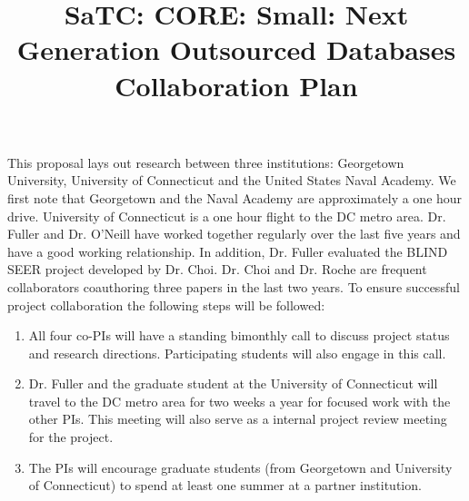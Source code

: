 \documentclass[11pt]{article}
\begin{document}
\title{SaTC: CORE: Small: Next Generation Outsourced Databases \\Collaboration Plan}

\maketitle

This proposal lays out research between three institutions: Georgetown University, University of Connecticut and the United States Naval Academy.  We first note that Georgetown and the Naval Academy are approximately a one hour drive.  University of Connecticut is a one hour flight to the DC metro area. Dr. Fuller and Dr. O'Neill have worked together regularly over the last five years and have a good working relationship.  In addition, Dr. Fuller evaluated the BLIND SEER project developed by Dr. Choi.  Dr. Choi and Dr. Roche are frequent collaborators coauthoring three papers in the last two years.  To ensure successful project collaboration the following steps will be followed:

\begin{enumerate}
\item All four co-PIs will have a standing bimonthly call to discuss project status and research directions.  Participating students will also engage in this call.
\item Dr. Fuller and the graduate student at the University of Connecticut will travel to the DC metro area for two weeks a year for focused work with the other PIs.  This meeting will also serve as a internal project review meeting for the project.
\item The PIs will encourage graduate students (from Georgetown and University of Connecticut) to spend at least one summer at a partner institution.
\end{enumerate}
\end{document}
